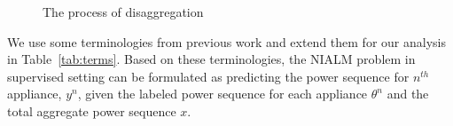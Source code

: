 \documentclass[conference]{IEEEtran}
\newcommand{\tabref}[1]{Table~\ref{#1}}
\begin{document}
\begin{figure} 
	
  	\caption{The process of disaggregation}
    \label{fig:disagg}
\end{figure}
We use some terminologies from previous work \cite{redd,parson2012_aaai,hart} and extend them for our analysis in \tabref{tab:terms}. Based on these terminologies, the NIALM problem in supervised setting can be formulated as predicting the power sequence for $n^{th}$ appliance, $y^n$, given the labeled power sequence for each appliance $\theta^n$ and the total aggregate power sequence $x$.
\end{document}
